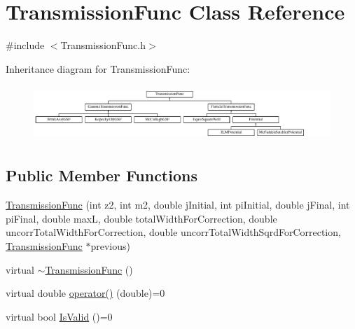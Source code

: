 \hypertarget{classTransmissionFunc}{\section{Transmission\-Func Class Reference}
\label{classTransmissionFunc}
}


{\ttfamily \#include $<$Transmission\-Func.\-h$>$}

Inheritance diagram for Transmission\-Func\-:\begin{figure}[H]
\begin{center}
\leavevmode
\includegraphics[height=2.121212cm]{dc/d0d/classTransmissionFunc}
\end{center}
\end{figure}
\subsection*{Public Member Functions}
\begin{DoxyCompactItemize}
\item 
\hyperlink{classTransmissionFunc_a6c7c0f1a3c272a9942e897328747ccce}{Transmission\-Func} (int z2, int m2, double j\-Initial, int pi\-Initial, double j\-Final, int pi\-Final, double max\-L, double total\-Width\-For\-Correction, double uncorr\-Total\-Width\-For\-Correction, double uncorr\-Total\-Width\-Sqrd\-For\-Correction, \hyperlink{classTransmissionFunc}{Transmission\-Func} $\ast$previous)
\item 
virtual \hyperlink{classTransmissionFunc_a8f3c3437541f0cb96a6cef9a04e3baa9}{$\sim$\-Transmission\-Func} ()
\item 
virtual double \hyperlink{classTransmissionFunc_ad8df0c8bc498f200ee8b4b95916fe987}{operator()} (double)=0
\item 
virtual bool \hyperlink{classTransmissionFunc_a6dadf2b6cfc37d4c3da0f8ee2a1563af}{Is\-Valid} ()=0
\end{DoxyCompactItemize}
